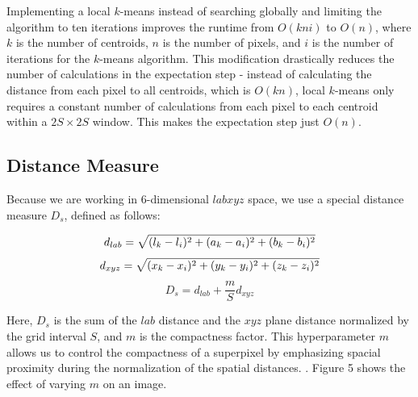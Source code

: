 \documentclass[11pt,twocolumn]{article}
\begin{document}
Implementing a local $k$-means instead of searching globally and limiting the algorithm to ten iterations improves the runtime from $O(kni)$ to $O(n)$, where $k$ is the number of centroids, $n$ is the number of pixels, and $i$ is the number of iterations for the $k$-means algorithm. This modification drastically reduces the number of calculations in the expectation step - instead of calculating the distance from each pixel to all centroids, which is $O(kn)$, local $k$-means only requires a constant number of calculations from each pixel to each centroid within a $2S \times 2S$ window. This makes the expectation step just $O(n)$. 

\subsection{Distance Measure}
Because we are working in 6-dimensional $labxyz$ space, we use a special distance measure $D_{s}$, defined as follows:

\begin{equation}
d_{lab} = \sqrt{(l_{k} - l_{i})^2+(a_{k}-a_{i})^2+(b_{k}-b_{i})^2} \\
\end{equation}
\begin{equation}
d_{xyz} = \sqrt{(x_{k}-x_{i})^2+(y_{k} - y_{i})^2 + (z_{k}-z_{i})^2} \\
\end{equation}
\begin{equation}
D_{s} = d_{lab} + \frac{m}{S}d_{xyz}
\end{equation}

Here, $D_{s}$ is the sum of the $lab$ distance and the $xyz$ plane distance normalized by the grid interval $S$, and $m$ is the compactness factor. This hyperparameter $m$ allows us to control the compactness of a superpixel by emphasizing spacial proximity during the normalization of the spatial distances. \cite{slic}. Figure 5 shows the effect of varying $m$ on an image.
\end{document}
